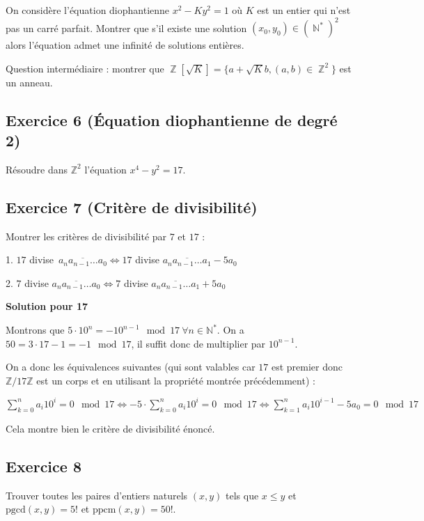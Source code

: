 \documentclass{article}
\DeclareMathOperator{\Z}{\mathbb{Z}}
\DeclareMathOperator{\N}{\mathbb{N}}
\begin{document}
On considère l'équation diophantienne $x^2 - Ky^2 = 1$ où $K$ est un entier qui n'est pas un carré parfait. 
Montrer que s'il existe une solution $(x_0, y_0) \in (\N^*)^2$ alors l'équation admet une infinité de solutions entières. 

Question intermédiaire : montrer que $\Z[\sqrt{K}] = \{ a + \sqrt{K}b, (a, b) \in \Z^2 \}$ est un anneau. 

\subsection*{Exercice 6 (Équation diophantienne de degré 2)} 

Résoudre dans $\mathbb{Z}^2$ l'équation $x^4 - y^2 = 17$. 

\subsection*{Exercice 7 (Critère de divisibilité)} 

Montrer les critères de divisibilité par $7$ et $17$ : 

1. $17$ divise $\overline{a_na_{n-1}\dots a_0} \Longleftrightarrow 17$ divise $\overline{a_na_{n-1}\dots a_1} - 5a_0$ 


2. $7$ divise $\overline{a_na_{n-1}\dots a_0} \Longleftrightarrow 7$ divise $\overline{a_na_{n-1}\dots a_1} + 5a_0$ 

\textbf{Solution pour 17} 

Montrons que $5\cdot 10^n = -10^{n-1} \mod 17 \ \forall n \in \mathbb{N}^*$. On a $50 = 3\cdot17 - 1 = -1 \mod 17$, il suffit donc de multiplier par $10^{n-1}$. 

On a donc les équivalences suivantes (qui sont valables car $17$ est premier donc $\mathbb{Z}/17\mathbb{Z}$ est un corps et en utilisant la propriété montrée précédemment) : 

$\displaystyle \sum_{k=0}^n{a_i 10^i} = 0 \mod 17 \Longleftrightarrow -5\cdot\sum_{k=0}^n{a_i 10^i} = 0 \mod 17 \Longleftrightarrow \sum_{k=1}^n{a_i 10^{i-1}}- 5a_0 = 0 \mod 17$ 

Cela montre bien le critère de divisibilité énoncé. 

\subsection*{Exercice 8} 

Trouver toutes les paires d'entiers naturels $(x, y)$ tels que $x \leqslant y$ et $\mathrm{pgcd}(x, y) = 5!$ et $\mathrm{ppcm}(x, y) = 50!$. 
\end{document}
